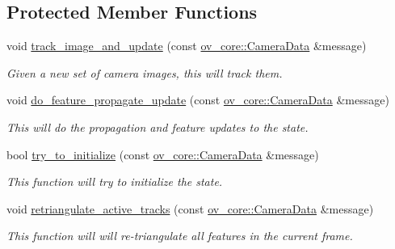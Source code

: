 \subsection*{Protected Member Functions}
\begin{DoxyCompactItemize}
\item 
void \hyperlink{classov__msckf_1_1VioManager_a626bd0d043f80c4d5e993bcfbbee0244}{track\+\_\+image\+\_\+and\+\_\+update} (const \hyperlink{structov__core_1_1CameraData}{ov\+\_\+core\+::\+Camera\+Data} \&message)
\begin{DoxyCompactList}\small\item\em Given a new set of camera images, this will track them. \end{DoxyCompactList}\item 
void \hyperlink{classov__msckf_1_1VioManager_a31d3fade828a229a1b5a99abd9aaa243}{do\+\_\+feature\+\_\+propagate\+\_\+update} (const \hyperlink{structov__core_1_1CameraData}{ov\+\_\+core\+::\+Camera\+Data} \&message)
\begin{DoxyCompactList}\small\item\em This will do the propagation and feature updates to the state. \end{DoxyCompactList}\item 
bool \hyperlink{classov__msckf_1_1VioManager_adc329d2be4fad2addd93e01e5318c102}{try\+\_\+to\+\_\+initialize} (const \hyperlink{structov__core_1_1CameraData}{ov\+\_\+core\+::\+Camera\+Data} \&message)
\begin{DoxyCompactList}\small\item\em This function will try to initialize the state. \end{DoxyCompactList}\item 
void \hyperlink{classov__msckf_1_1VioManager_ac3259add6e59f191388dfe989d668759}{retriangulate\+\_\+active\+\_\+tracks} (const \hyperlink{structov__core_1_1CameraData}{ov\+\_\+core\+::\+Camera\+Data} \&message)
\begin{DoxyCompactList}\small\item\em This function will will re-\/triangulate all features in the current frame. \end{DoxyCompactList}\end{DoxyCompactItemize}
